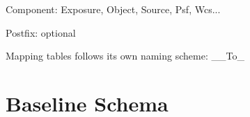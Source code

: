 \documentclass[DM,lsstdraft,toc]{lsstdoc}
\begin{document}
Component: Exposure, Object, Source, Psf, Wcs...

Postfix: optional

Mapping tables follows its own naming scheme: \_<table X name>\_To\_<table Y name>


\section{Baseline Schema}







\end{document}
